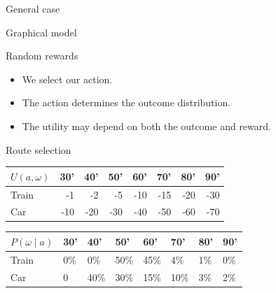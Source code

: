 \documentclass[smaller]{beamer}
\begin{document}
\begin{frame}[label={sec:org3c650f4}]{General case}
\begin{block}{Graphical model}
\begin{center}
\end{center}
\end{block}
\begin{block}{Random rewards}
\begin{itemize}
\item We \alert{select} our action.
\item The action determines the \alert{outcome} distribution.
\item The utility may depend on \alert{both} the outcome and reward.
\end{itemize}
\end{block}
\end{frame}
\begin{frame}[label={sec:org8112ade}]{Route selection}
\begin{example}[Utility]
\begin{center}
\begin{tabular}{l|rrrrrrr}
\hline
\(U(a, \omega)\) & 30' & 40' & 50' & 60' & 70' & 80' & 90'\\
\hline
Train & -1 & -2 & -5 & -10 & -15 & -20 & -30\\
Car & -10 & -20 & -30 & -40 & -50 & -60 & -70\\
\hline
\end{tabular}
\end{center}
\end{example}

\begin{example}[Probability]
\begin{center}
\begin{tabular}{l|lllllll}
\hline
\(P(\omega \mid a)\) & 30' & 40' & 50' & 60' & 70' & 80' & 90'\\
\hline
Train & 0\% & 0\% & 50\% & 45\% & 4\% & 1\% & 0\%\\
Car & 0 & 40\% & 30\% & 15\% & 10\% & 3\% & 2\%\\
\hline
\end{tabular}
\end{center}
\end{example}
\end{frame}
\end{document}
